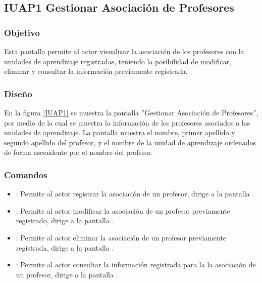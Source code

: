 \subsection{IUAP1 Gestionar Asociación de Profesores}

\subsubsection{Objetivo}
	
	Esta pantalla permite al actor visualizar la asociación de los profesores con la unidades de aprendizaje registradas, teniendo la posibilidad de modificar, eliminar y consultar la información previamente registrada.

\subsubsection{Diseño}

    En la figura \ref{IUAP1} se muestra la pantalla ''Gestionar Asociación de Profesores'', por medio de la cual se muestra la información de los profesores asociados a las unidades de aprendizaje. La pantalla muestra el nombre, primer apellido y segundo apellido del profesor, y el nombre de la unidad de aprendizaje ordenados de forma ascendente por el nombre del profesor.
 

\subsubsection{Comandos}
    \begin{itemize}
		\item \btnRegistrar: Permite al actor registrar la asociación de un profesor, dirige a la pantalla .
		
		\item {}: Permite al actor modificar la asociación de un profesor previamente registrado, dirige a la pantalla .
		
		\item {}: Permite al actor eliminar la asociación de un profesor previamente registrada, dirige a la pantalla .
	
		\item {}: Permite al actor consultar la información registrada para la la asociación de un profesor, dirige a la pantalla .
    \end{itemize}
